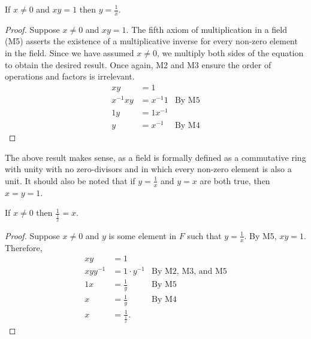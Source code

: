 \begin{proposition}
	If $x \neq 0$ and $xy = 1$ then $y = \frac{1}{x}$.
\end{proposition}
\begin{proof}
	Suppose $x \neq 0$ and $xy = 1$. The fifth axiom of multiplication in a field (M5) asserts the existence of a multiplicative inverse for every non-zero element in the field. Since we have assumed $x \neq 0$, we multiply both sides of the equation to obtain the desired result. Once again, M2 and M3 ensure the order of operations and factors is irrelevant.
	\begin{align*}
	xy &= 1 & \\
	x^{-1}xy &= x^{-1}1 &\text{By M5} \\
	1y &= 1x^{-1} &\\
	y &= x^{-1} &\text{By M4}
	\end{align*}
\end{proof}
The above result makes sense, as a field is formally defined as a commutative ring with unity with no zero-divisors and in which every non-zero element is also a unit. It should also be noted that if $y = \frac{1}{x}$ and $y = x$ are both true, then $x = y = 1$.

\begin{proposition}
	If $x \neq 0$ then $\frac{1}{\frac{1}{x}} = x$.
\end{proposition}
\begin{proof}
	Suppose $x \neq 0$ and $y$ is some element in $F$ such that $y = \frac{1}{x}$. By M5, $xy = 1$. Therefore,
	\begin{align*}
	xy &= 1 & \\
	xyy^{-1} &= 1 \cdot y^{-1} &\text{By M2, M3, and M5} \\
	1x &= \frac{1}{y} &\text{By M5}\\
	x &= \frac{1}{y} &\text{By M4}\\
	x &= \frac{1}{\frac{1}{x}}. &
	\end{align*}
\end{proof}
